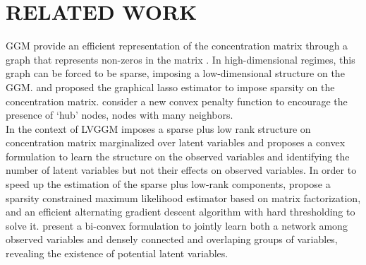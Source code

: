 \section{RELATED WORK}
\label{related}

GGM provide an efficient representation of the concentration matrix through a graph that represents non-zeros in the matrix \citep{lauritzen1996graphical}. In high-dimensional regimes, this graph can be forced to be sparse, imposing a low-dimensional structure on the GGM. \citet{yuan2007model} and \citet{banerjee2008model} proposed the graphical lasso estimator to impose sparsity on the concentration matrix. \citet{tan2014learning} consider a new convex penalty function to encourage the presence of ‘hub’ nodes, nodes with many neighbors.\\
In the context of LVGGM \citet{chandrasekaran2010} imposes a sparse plus low rank structure on concentration matrix marginalized over latent variables and proposes a convex formulation to learn the structure on the observed variables and identifying the number of latent variables but not their effects on observed variables. In order to speed
up the estimation of the sparse plus low-rank components,\citet{xu2017speeding} propose a sparsity constrained maximum likelihood estimator based on matrix factorization, and an efficient alternating gradient descent algorithm with hard thresholding to solve it. \citet{hosseini2016learning}  present a bi-convex formulation to jointly learn both a network among observed variables and densely connected and overlaping groups of variables, revealing the existence of potential latent variables. 
%

%
%
%
